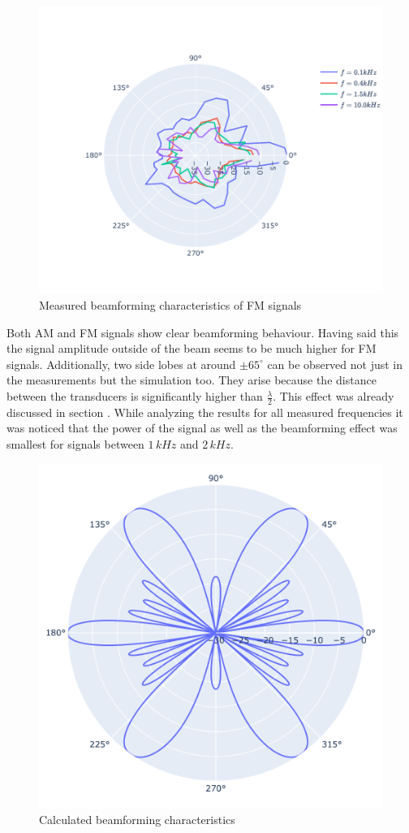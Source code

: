 \begin{figure}
  \centering
  \includegraphics[height=\largeheight]{src/assets/pictures/measurements/beamforming_fm_polar.pdf}
  \caption{Measured beamforming characteristics of FM signals}\label{fig:meas:beam:polar_meas_fm}
\end{figure}
\p
Both AM and FM signals show clear beamforming behaviour. Having said this the signal amplitude outside of the beam seems to be much higher for FM signals. Additionally, two side lobes at around $\pm 65^\circ$ can be observed not just in the measurements but the simulation too. They arise because the distance between the transducers is significantly higher than $\frac{\lambda}{2}$. This effect was already discussed in section . While analyzing the results for all measured frequencies it was noticed that the power of the signal as well as the beamforming effect was smallest for signals between $1\,kHz$ and $2\,kHz$.
%
\begin{figure}
  \centering
  \includegraphics[height=\mediumheight]{src/assets/pictures/measurements/beamforming_calc_polar.png}
  \caption{Calculated beamforming characteristics}\label{fig:meas:beam:polar_calc}
\end{figure}